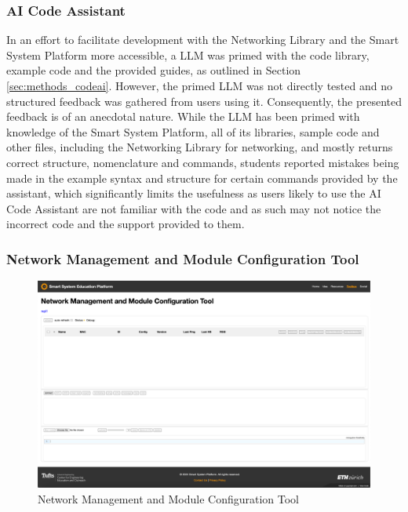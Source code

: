 \subsubsection{\label{sec:res_ai_code}AI Code Assistant}
In an effort to facilitate development with the Networking Library and the Smart System Platform more accessible, a LLM was primed with the code library, example code and the provided guides, as outlined in Section \ref{sec:methods_codeai}. However, the primed LLM was not directly tested and no structured feedback was gathered from users using it. Consequently, the presented feedback is of an anecdotal nature. While the LLM has been primed with knowledge of the Smart System Platform, all of its libraries, sample code and other files, including the Networking Library for networking, and mostly returns correct structure, nomenclature and commands, students reported mistakes being made in the example syntax and structure for certain commands provided by the assistant, which significantly limits the usefulness as users likely to use the AI Code Assistant are not familiar with the code and as such may not notice the incorrect code and the support provided to them.

\subsubsection{\label{sec:res_nmmct}Network Management and Module Configuration Tool}

\begin{figure}[H]
    \centering
    \includegraphics[width=\linewidth]{overleaf/images/nmmct_raw.png}
    \vspace{\ftspace}
    \caption{Network Management and Module Configuration Tool}
    \vspace{\ftspace}
    \label{fig:nmmct_raw}
\end{figure}

